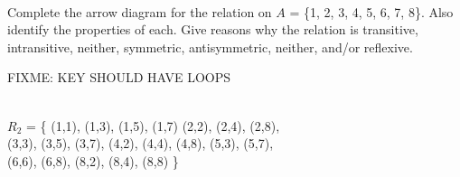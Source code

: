 \documentclass[a4paper,12pt]{book}
\newcounter{question}
\begin{document}
    \newpage


    \begin{questionNOGRADE}{\thequestion}

        ~\\
        Complete the arrow diagram for the relation on
        \small
        $A$ = \{1, 2, 3, 4, 5, 6, 7, 8\}.
        \normalsize
        Also identify the properties of each. Give reasons why the relation is
        transitive, intransitive, neither, symmetric, antisymmetric, neither, and/or
        reflexive.

        FIXME: KEY SHOULD HAVE LOOPS

        ~\\
        $ R_{2} $ = \{  (1,1), (1,3), (1,5), (1,7) \tab
                        (2,2), (2,4), (2,8), \\ \tab[1.3cm]
                        (3,3), (3,5), (3,7), \tab
                        (4,2), (4,4), (4,8), \tab
                        (5,3), (5,7), \\ \tab[1.3cm]
                        (6,6), (6,8), \tab
                        (8,2), (8,4), (8,8)
                 \}

\end{questionNOGRADE}
\end{document}
